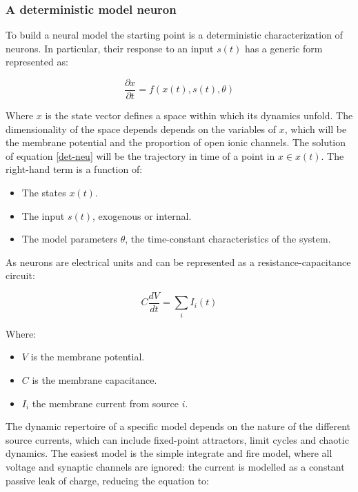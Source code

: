 		\subsubsection{A deterministic model neuron}
		To build a neural model the starting point is a deterministic characterization of neurons.
		In particular, their response to an input $s(t)$ has a generic form represented as:

		\begin{equation}
			\frac{\partial x}{\partial t} = f(x(t), s(t), \theta)
			\label{det-neu}
		\end{equation}

		Where $x$ is the state vector defines a space within which its dynamics unfold.
		The dimensionality of the space depends depends on the variables of $x$, which will be the membrane potential and the proportion of open ionic channels.
		The solution of equation \ref{det-neu} will be the trajectory in time of a point in $x\in x(t)$.
		The right-hand term is a function of:

		\begin{itemize}
			\item The states $x(t)$.
			\item The input $s(t)$, exogenous or internal.
			\item The model parameters $\theta$, the time-constant characteristics of the system.
		\end{itemize}

		As neurons are electrical units and can be represented as a resistance-capacitance circuit:

		$$C\frac{dV}{dt} = \sum\limits_i I_i(t)$$

		Where:

		\begin{itemize}
			\item $V$ is the membrane potential.
			\item $C$ is the membrane capacitance.
			\item $I_i$ the membrane current from source $i$.
		\end{itemize}

		The dynamic repertoire of a specific model depends on the nature of the different source currents, which can include fixed-point attractors, limit cycles and chaotic dynamics.
		The easiest model is the simple integrate and fire model, where all voltage and synaptic channels are ignored: the current is modelled as a constant passive leak of charge, reducing the equation to:

